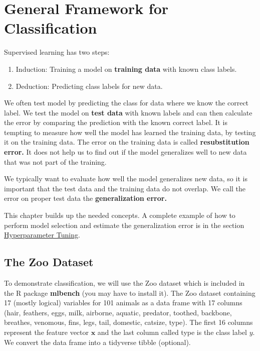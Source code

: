 \documentclass[
  notitlepage]{book}
\providecommand{\tightlist}{%
  \setlength{\itemsep}{0pt}\setlength{\parskip}{0pt}}
\begin{document}
\hypertarget{general-framework-for-classification}{%
\section{General Framework for Classification}\label{general-framework-for-classification}}

Supervised learning has two steps:

\begin{enumerate}
\def\labelenumi{\arabic{enumi}.}
\tightlist
\item
  Induction: Training a model on \textbf{training data} with known class labels.
\item
  Deduction: Predicting class labels for new data.
\end{enumerate}

We often test model by predicting the class for data where we know the
correct label. We test the model on \textbf{test data} with known labels
and can then calculate the error by comparing the prediction with the
known correct label.
It is tempting to measure how well the model has learned the
training data, by testing it on the training data. The error on the
training data is called \textbf{resubstitution error.} It does not
help us to find out if the model generalizes well to new data that
was not part of the training.

We typically want to
evaluate how well the model generalizes new data, so it is important that
the test data and the training data do not overlap. We call the
error on proper test data the \textbf{generalization error.}

This chapter builds up the needed concepts.
A complete example of how to perform model selection and estimate
the generalization error is in the section \protect\hyperlink{hyperparameter-tuning}{Hyperparameter Tuning}.

\hypertarget{the-zoo-dataset}{%
\subsection{The Zoo Dataset}\label{the-zoo-dataset}}

To demonstrate classification, we will use the Zoo dataset which is included in the R package
\textbf{mlbench} (you may have to install it). The Zoo dataset containing 17
(mostly logical) variables for 101 animals as a data frame with
17 columns (hair, feathers, eggs, milk, airborne, aquatic, predator,
toothed, backbone, breathes, venomous, fins, legs, tail, domestic,
catsize, type).
The first 16 columns represent the feature vector \(\mathbf{x}\) and the last column
called type is the class label \(y\).
We convert the data frame into a tidyverse tibble
(optional).
\end{document}
